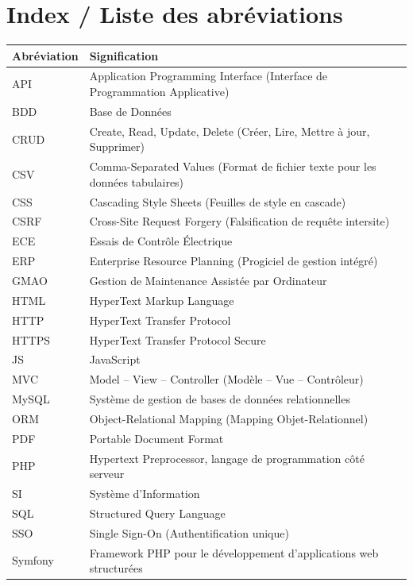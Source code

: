 \documentclass[11pt,a4paper]{article}
\begin{document}
\newpage
\section*{Index / Liste des abréviations}

\begin{tabular}{|p{4cm}|p{11cm}|}
\hline
\textbf{Abréviation} & \textbf{Signification} \\
\hline
API & Application Programming Interface (Interface de Programmation Applicative) \\
\hline
BDD & Base de Données \\
\hline
CRUD & Create, Read, Update, Delete (Créer, Lire, Mettre à jour, Supprimer) \\
\hline
CSV & Comma-Separated Values (Format de fichier texte pour les données tabulaires) \\
\hline
CSS & Cascading Style Sheets (Feuilles de style en cascade) \\
\hline
CSRF & Cross-Site Request Forgery (Falsification de requête intersite) \\
\hline
ECE & Essais de Contrôle Électrique \\
\hline
ERP & Enterprise Resource Planning (Progiciel de gestion intégré) \\
\hline
GMAO & Gestion de Maintenance Assistée par Ordinateur \\
\hline
HTML & HyperText Markup Language \\
\hline
HTTP & HyperText Transfer Protocol \\
\hline
HTTPS & HyperText Transfer Protocol Secure \\
\hline
JS & JavaScript \\
\hline
MVC & Model – View – Controller (Modèle – Vue – Contrôleur) \\
\hline
MySQL & Système de gestion de bases de données relationnelles \\
\hline
ORM & Object-Relational Mapping (Mapping Objet-Relationnel) \\
\hline
PDF & Portable Document Format \\
\hline
PHP & Hypertext Preprocessor, langage de programmation côté serveur \\
\hline
SI & Système d’Information \\
\hline
SQL & Structured Query Language \\
\hline
SSO & Single Sign-On (Authentification unique) \\
\hline
Symfony & Framework PHP pour le développement d'applications web structurées \\

\end{tabular}
\end{document}
